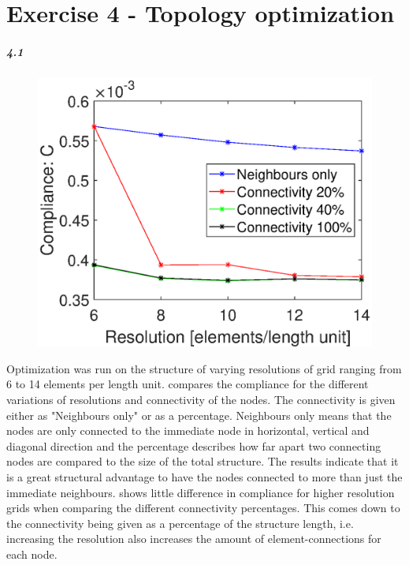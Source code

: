 \chapter{Exercise 4 - Topology optimization}
\paragraph{4.1}
\begin{figure}
\flushright
    \centering
    \includegraphics[trim=.0cm .0cm .0cm .0cm, clip=true,width=1\linewidth]{Figures/Plots/Comp_res_plot.eps}
\caption{}
\label{fig:com_res}
\end{figure}
Optimization was run on the structure of varying resolutions of grid ranging from 6 to 14 elements per length unit.  compares the compliance for the different variations of resolutions and connectivity of the nodes.
The connectivity is given either as "Neighbours only" or as a percentage. Neighbours only means that the nodes are only connected to the immediate node in horizontal, vertical and diagonal direction and the percentage describes how far apart two connecting nodes are compared to the size of the total structure.
The results indicate that it is a great structural advantage to have the nodes connected to more than just the immediate neighbours.  shows little difference in compliance for higher resolution grids when comparing the different connectivity percentages. This comes down to the connectivity being given as a percentage of the structure length, i.e. increasing the resolution also increases the amount of element-connections for each node.
\squeezeup
\squeezeup
